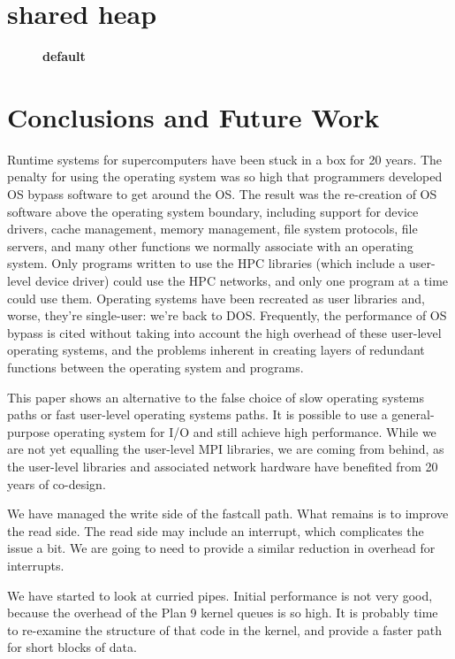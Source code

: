 \documentclass[letterpaper,twocolumn,10pt]{article}
\begin{document}
\section{shared heap}
\begin{figure}[htbp]
\begin{center}
\scalebox{.25}{}
\caption{{\bf default}}
\label{default}
\end{center}
\end{figure}


\section{Conclusions and Future Work}
Runtime systems for supercomputers have been stuck in a box for 20 years. The penalty for using the operating system was so high that programmers developed OS bypass software to get around the OS. The result was the re-creation of OS software above the operating system boundary, including support for device drivers, cache management, memory management, file system protocols, file servers, and many other functions we normally associate with an operating system. Only programs written to use the HPC libraries (which include a user-level device driver) could use the HPC networks, and only one program at a time could use them. Operating systems have been recreated as user libraries and, worse, they're single-user: we're back to DOS. Frequently, the performance of OS bypass is cited without taking into account the high overhead of these user-level operating systems, and the problems inherent in creating layers of redundant functions between the operating system and programs. 

This paper shows an alternative to the false choice of slow operating systems paths or fast user-level operating systems paths. It is possible to use a general-purpose operating system for I/O and still achieve high performance. While we are not yet equalling the user-level MPI libraries, we are coming from behind, as the user-level libraries and associated network hardware have benefited from 20 years of co-design. 

We have managed the write side of the fastcall path. What remains is to improve the read side. The read side may include an interrupt, which complicates the issue a bit. We are going to need to provide a similar reduction in overhead for interrupts. 

We have started to look at curried pipes. Initial performance is not very good, because the overhead of 
the Plan 9 kernel queues is so high. It is probably time to re-examine the structure of that code in the kernel, and provide 
a faster path for short blocks of data. 
\end{document}
